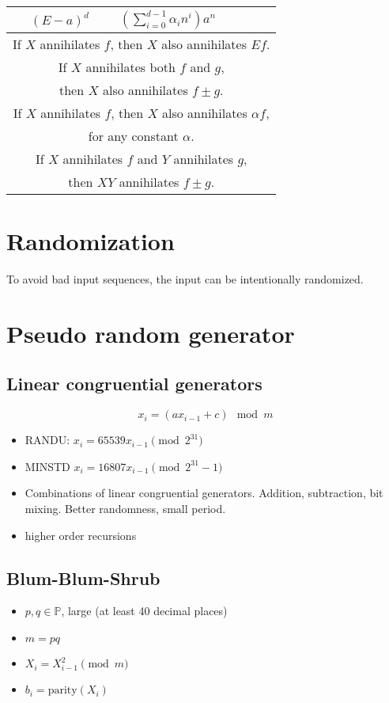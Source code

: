 \begin{multicols}{5}
{\begin{tabular}{ | c | l | }
    $(E - a)^d$ & $(\sum_{i=0}^{d-1}\alpha_in^i)a^n$ \\\hline\hline
    \multicolumn{2}{|c|}{If $X$ annihilates $f$, then $X$ also annihilates $E f$.} \\
\multicolumn{2}{|c|}{If $X$ annihilates both $f$ and $g$,} \\
\multicolumn{2}{|c|}{then $X$ also annihilates $f\pm g$.} \\
\multicolumn{2}{|c|}{If $X$ annihilates $f$, then $X$ also annihilates $\alpha f$,} \\
\multicolumn{2}{|c|}{for any constant $\alpha$.} \\\hline\hline
    \multicolumn{2}{|c|}{If $X$ annihilates $f$ and $Y$ annihilates $g$,}\\
    \multicolumn{2}{|c|}{then $XY$ annihilates $f\pm g$.} \\\hline
\end{tabular}
}
\section{Randomization}
To avoid bad input sequences, the input can be intentionally randomized.
\section{Pseudo random generator}
\subsection{Linear congruential generators}
\[
	x_i = (a x_{i-1} + c) \mod m
\]
\begin{itemize}
	\item RANDU: $x_i = 65539 x_{i-1}\pmod {2^{31}}$
	\item MINSTD $x_i = 16807 x_{i-1}\pmod {2^{31}-1}$
	\item Combinations of linear congruential generators. Addition, subtraction, bit mixing.
		Better randomness, small period.
	\item higher order recursions
\end{itemize}
\subsection{Blum-Blum-Shrub}
\begin{itemize}
	\item $p, q\in \mathbb{P}$, large (at least 40 decimal places)
	\item $m = pq$
	\item $X_i=X_{i-1}^2 \pmod m$
	\item $b_i = \text{parity}(X_i)$
\end{itemize}



\end{multicols}
